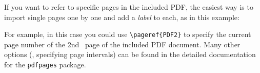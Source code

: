 If you want to refer to specific pages in the included PDF, the easiest way is to import
single pages one by one and add a \emph{label} to each, as in this example:
%
\begin{LaTeXCode}[numbers=none]


\end{LaTeXCode}
%
For example, in this case you could use \verb!\pageref{PDF2}! to specify the current page
number of the 2nd \ page of the included PDF document. 
Many other options (\eg, specifying page intervals) can be found in the detailed documentation
for the \texttt{pdfpages} package.





